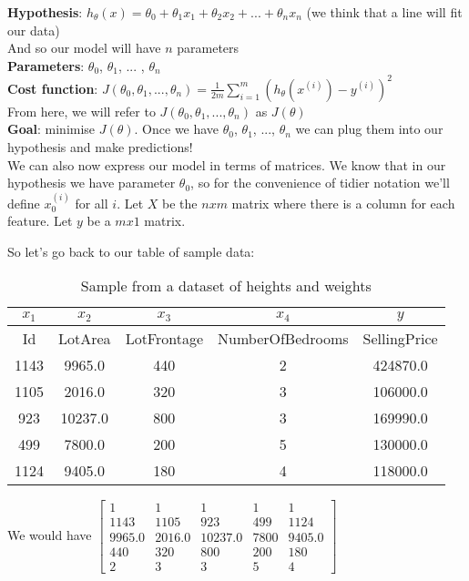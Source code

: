 \documentclass[11pt]{article}
\begin{document}
\textbf{Hypothesis}: $h_\theta(x) = \theta_0 + \theta_1x_1+ \theta_2x_2 + ... +  \theta_nx_n$ (we think that a line will fit our data) \\

And so our model will have $n$ parameters \\

\textbf{Parameters}: $\theta_0$, $\theta_1$, ... , $\theta_n$ \\

\textbf{Cost function}: \(J(\theta_0, \theta_1,..., \theta_n) = \frac{1}{2m} \sum^m_{i=1}(h_\theta(x^{(i)}) - y^{(i)})^2\) \\

From here, we will refer to $J(\theta_0, \theta_1,..., \theta_n) $ as $J(\theta)$\\

\textbf{Goal}: minimise $J(\theta)$. Once we have $\theta_0$, $\theta_1$, ..., $\theta_n$ we can plug them into our hypothesis and make predictions!\\

We can also now express our model in terms of matrices. We know that in our hypothesis we have parameter $\theta_0$, so for the convenience of tidier notation we'll define $x_0^{(i)}$ for all $i$. Let $X$ be the $n x m$ matrix where there is a column for each feature. Let $y$ be a $m x 1$ matrix.

So let's go back to our table of sample data: 
\begin{table}[htp]
\caption{Sample from a dataset of heights and weights}
\label{table:sample-ames}
\begin{center}
\begin{tabular}{|c|c|c|c|c|}
\hline
$x_1$ & $x_2$ & $x_3$ & $x_4$ & $y$\\ \hline
Id & LotArea & LotFrontage & NumberOfBedrooms & SellingPrice \\ \hline
1143 & 9965.0 & 440 & 2 & 424870.0 \\
1105 & 2016.0 & 320 & 3 & 106000.0 \\
923 & 10237.0 & 800 & 3 & 169990.0\\
499& 7800.0 & 200 & 5 & 130000.0\\
1124 & 9405.0 & 180 & 4 & 118000.0 \\
\hline
\end{tabular}
\end{center}
\label{Sample housing price data}
\end{table}%

We would have 
 \(\begin{bmatrix}
 1 & 1 & 1 & 1 & 1 \\
1143 & 1105 & 923 & 499 & 1124 \\
9965.0 & 2016.0 & 10237.0 & 7800 & 9405.0 \\
440 & 320 & 800 & 200 & 180 \\
2 & 3 & 3 & 5 & 4 
 \end{bmatrix} \)
 
\end{document}
